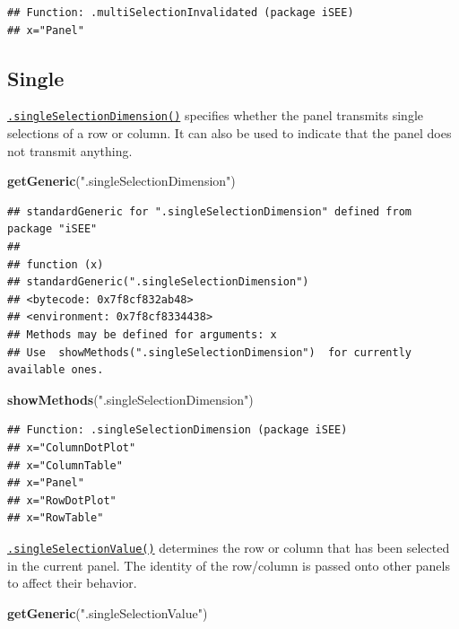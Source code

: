 \documentclass[
]{book}
\newenvironment{Shaded}{\begin{snugshade}}{\end{snugshade}}
\newcommand{\KeywordTok}[1]{\textcolor[rgb]{0.13,0.29,0.53}{\textbf{#1}}}
\newcommand{\NormalTok}[1]{#1}
\newcommand{\StringTok}[1]{\textcolor[rgb]{0.31,0.60,0.02}{#1}}
\begin{document}
\begin{verbatim}
## Function: .multiSelectionInvalidated (package iSEE)
## x="Panel"
\end{verbatim}

\hypertarget{single}{%
\subsection{Single}\label{single}}

\href{https://isee.github.io/iSEE/reference/single-select-generics.html}{\texttt{.singleSelectionDimension()}} specifies whether the panel transmits single selections of a row or column.
It can also be used to indicate that the panel does not transmit anything.

\begin{Shaded}
\begin{Highlighting}[]
\KeywordTok{getGeneric}\NormalTok{(}\StringTok{".singleSelectionDimension"}\NormalTok{)}
\end{Highlighting}
\end{Shaded}

\begin{verbatim}
## standardGeneric for ".singleSelectionDimension" defined from package "iSEE"
## 
## function (x) 
## standardGeneric(".singleSelectionDimension")
## <bytecode: 0x7f8cf832ab48>
## <environment: 0x7f8cf8334438>
## Methods may be defined for arguments: x
## Use  showMethods(".singleSelectionDimension")  for currently available ones.
\end{verbatim}

\begin{Shaded}
\begin{Highlighting}[]
\KeywordTok{showMethods}\NormalTok{(}\StringTok{".singleSelectionDimension"}\NormalTok{)}
\end{Highlighting}
\end{Shaded}

\begin{verbatim}
## Function: .singleSelectionDimension (package iSEE)
## x="ColumnDotPlot"
## x="ColumnTable"
## x="Panel"
## x="RowDotPlot"
## x="RowTable"
\end{verbatim}

\href{https://isee.github.io/iSEE/reference/single-select-generics.html}{\texttt{.singleSelectionValue()}} determines the row or column that has been selected in the current panel.
The identity of the row/column is passed onto other panels to affect their behavior.

\begin{Shaded}
\begin{Highlighting}[]
\KeywordTok{getGeneric}\NormalTok{(}\StringTok{".singleSelectionValue"}\NormalTok{)}
\end{Highlighting}
\end{Shaded}
\end{document}
